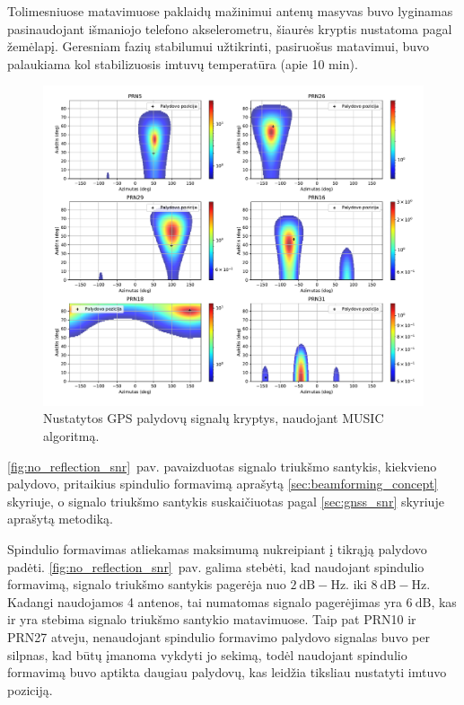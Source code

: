 \documentclass[main.tex]{subfiles}
\begin{document}
Tolimesniuose matavimuose paklaidų mažinimui antenų masyvas buvo lyginamas pa\-si\-nau\-do\-jant
išmaniojo telefono akselerometru, šiaurės kryptis nustatoma pagal žemėlapį.
Geresniam fazių stabilumui užtikrinti, pasiruošus matavimui, buvo palaukiama
kol stabilizuosis imtuvų temperatūra (apie 10 min).

\begin{figure}[ht]
    \begin{centering}
    \includegraphics[scale=0.55]{drawings/no_reflection}
    \par\end{centering}
    \protect\caption{\label{fig:no_reflection}Nustatytos GPS palydovų signalų kryptys, naudojant MUSIC algoritmą.}
\end{figure}

\ref{fig:no_reflection_snr}~pav. pavaizduotas signalo triukšmo santykis, kiekvieno palydovo,
pritaikius spindulio formavimą aprašytą \ref{sec:beamforming_concept} skyriuje, o
signalo triukšmo santykis suskaičiuotas pagal \ref{sec:gnss_snr} skyriuje aprašytą
metodiką.

Spindulio formavimas atliekamas maksimumą nukreipiant į tikrąją palydovo padėti.
\ref{fig:no_reflection_snr}~pav. galima stebėti, kad naudojant spindulio formavimą,
signalo triukšmo santykis pagerėja nuo $2\ \mathrm{dB-Hz}$. iki $8\ \mathrm{dB-Hz}$.
Kadangi naudojamos 4 antenos, tai numatomas signalo pagerėjimas yra $6\ \mathrm{dB}$,
kas ir yra stebima signalo triukšmo santykio matavimuose. Taip pat PRN10 ir PRN27 atveju,
nenaudojant spindulio formavimo palydovo signalas buvo per silpnas, kad būtų
įmanoma vykdyti jo sekimą, todėl naudojant spindulio formavimą buvo aptikta
daugiau palydovų, kas leidžia tiksliau nustatyti imtuvo poziciją.
\end{document}
